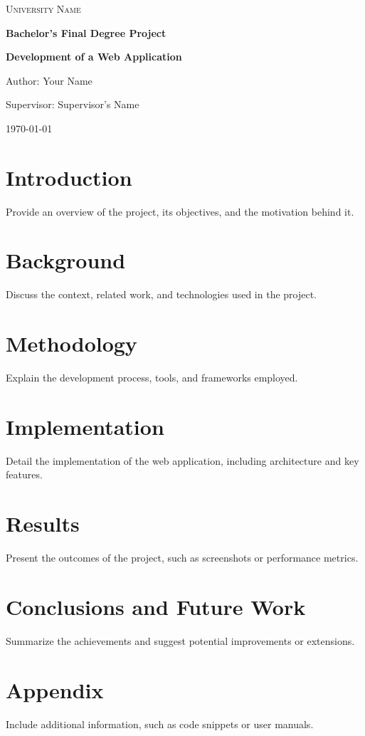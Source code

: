 \documentclass[a4paper,12pt]{article}
\begin{document}
\begin{titlepage}
    \centering
    {\scshape\LARGE University Name \par}
    \vspace{1.5cm}
    {\huge\bfseries Bachelor's Final Degree Project \par}
    \vspace{2cm}
    {\Large\bfseries Development of a Web Application \par}
    \vspace{1.5cm}
    {\Large Author: Your Name \par}
    \vfill
    {\large Supervisor: Supervisor's Name \par}
    \vspace{1cm}
    {\large \today \par}
\end{titlepage}

\tableofcontents
\newpage

\section{Introduction}
Provide an overview of the project, its objectives, and the motivation behind it.

\section{Background}
Discuss the context, related work, and technologies used in the project.

\section{Methodology}
Explain the development process, tools, and frameworks employed.

\section{Implementation}
Detail the implementation of the web application, including architecture and key features.

\section{Results}
Present the outcomes of the project, such as screenshots or performance metrics.

\section{Conclusions and Future Work}
Summarize the achievements and suggest potential improvements or extensions.

\appendix
\section{Appendix}
Include additional information, such as code snippets or user manuals.
\end{document}

